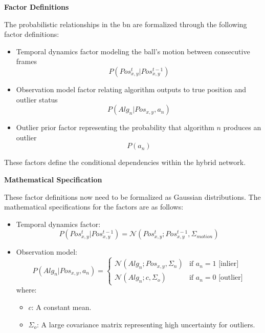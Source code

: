 \documentclass[12pt,a4paper]{article}
\begin{document}
 
\textbf{Factor Definitions}

The probabilistic relationships in the \acs{bn} are formalized through the following factor definitions:

\begin{itemize}
	\item Temporal dynamics factor modeling the ball's motion between consecutive frames
	\begin{equation}P(Pos_{x,y}^t | Pos_{x,y}^{t-1})\end{equation}
	\item Observation model factor relating algorithm outputs to true position and outlier status
	\begin{equation}P(Alg_n | Pos_{x,y}, a_n)\end{equation}
	\item Outlier prior factor representing the probability that algorithm $n$ produces an outlier
	\begin{equation}P(a_n)\end{equation} 
\end{itemize}

These factors define the conditional dependencies within the hybrid network.

\textbf{Mathematical Specification}

These factor definitions now need to be formalized as Gaussian distributions. The mathematical specifications for the factors are as follows:

\begin{itemize}
	\item Temporal dynamics factor:
	\begin{equation} P(Pos_{x,y}^t | Pos_{x,y}^{t-1}) = \mathcal{N}(Pos_{x,y}^t; Pos_{x,y}^{t-1}, \Sigma_{motion}) \end{equation}
	\item Observation model:
	\begin{equation}
	P(Alg_n | Pos_{x,y}, a_n) = \begin{cases}
	\mathcal{N}(Alg_n; Pos_{x,y}, \Sigma_n) & \text{if } a_n = 1 \text{ [inlier]} \\
	\mathcal{N}(Alg_n; c, \Sigma_o) & \text{if } a_n = 0 \text{ [outlier]}
	\end{cases}
	\end{equation}
	where:
	\begin{itemize}
		\item $c$: A constant mean.
		\item $\Sigma_o$: A large covariance matrix representing high uncertainty for outliers.
	\end{itemize}
\end{itemize}
\end{document}
